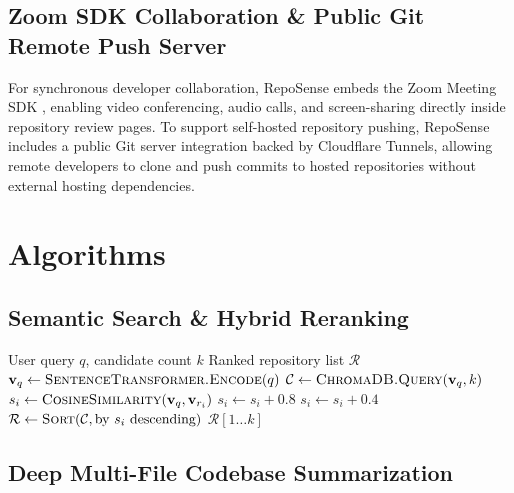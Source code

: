 \documentclass[journal]{IEEEtran}
\begin{document}
\subsection{Zoom SDK Collaboration & Public Git Remote Push Server}

For synchronous developer collaboration, RepoSense embeds the Zoom Meeting SDK \cite{zoom_sdk}, enabling video conferencing, audio calls, and screen-sharing directly inside repository review pages. To support self-hosted repository pushing, RepoSense includes a public Git server integration backed by Cloudflare Tunnels, allowing remote developers to clone and push commits to hosted repositories without external hosting dependencies.

\section{Algorithms}
\label{sec:algorithms}

\subsection{Semantic Search & Hybrid Reranking}

\begin{algorithm}
\caption{Semantic Search with Hybrid Reranking}
\begin{algorithmic}[1]
\Require User query $q$, candidate count $k$
\Ensure Ranked repository list $\mathcal{R}$
\State $\mathbf{v}_q \leftarrow \textsc{SentenceTransformer.Encode}(q)$
\State $\mathcal{C} \leftarrow \textsc{ChromaDB.Query}(\mathbf{v}_q, k)$
    \State $s_i \leftarrow \textsc{CosineSimilarity}(\mathbf{v}_q, \mathbf{v}_{r_i})$
        \State $s_i \leftarrow s_i + 0.8$
        \State $s_i \leftarrow s_i + 0.4$
    \EndIf
\EndFor
\State $\mathcal{R} \leftarrow \textsc{Sort}(\mathcal{C}, \text{by } s_i \text{ descending})$
\State \Return $\mathcal{R}[1 \ldots k]$
\end{algorithmic}
\end{algorithm}

\subsection{Deep Multi-File Codebase Summarization}
\end{document}
